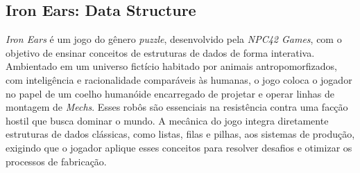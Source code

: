 \subsection{Iron Ears: Data Structure}

\textit{Iron Ears} é um jogo do gênero \textit{puzzle}, desenvolvido pela \textit{NPC42 Games}, com o objetivo de ensinar conceitos de estruturas de dados de forma interativa. Ambientado em um universo fictício habitado por animais antropomorfizados, com inteligência e racionalidade comparáveis às humanas, o jogo coloca o jogador no papel de um coelho humanóide encarregado de projetar e operar linhas de montagem de \textit{Mechs}. Esses robôs são essenciais na resistência contra uma facção hostil que busca dominar o mundo. A mecânica do jogo integra diretamente estruturas de dados clássicas, como listas, filas e pilhas, aos sistemas de produção, exigindo que o jogador aplique esses conceitos para resolver desafios e otimizar os processos de fabricação. \cite{IronEarsItchio}



